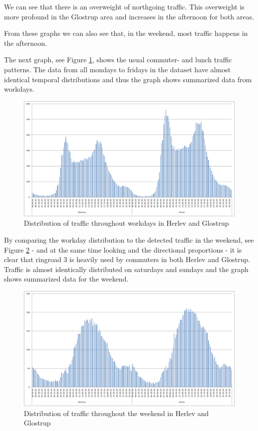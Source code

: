 We can see that there is an overweight of northgoing traffic. This overweight is more profound in the Glostrup area and increases in the afternoon for both areas.

From these graphs we can also see that, in the weekend, most traffic happens in the afternoon.

The next graph, see Figure \ref{fig:commuter}, shows the usual commuter- and lunch traffic patterns. The data from all mondays to fridays in the dataset have almost identical temporal distributions and thus the graph shows summarized data from workdays.

\begin{figure}[!ht]
\begin{center}
\includegraphics[scale=0.25]{distribution_workday.png} 
\end{center}
\caption{Distribution of traffic throughout workdays in Herlev and Glostrup}
\label{fig:commuter}
\end{figure}

By comparing the workday distribution to the detected traffic in the weekend, see Figure \ref{fig:weekends} - and at the same time looking and the directional proportions - it is clear that ringroad 3 is heavily used by commuters in both Herlev and Glostrup. Traffic is almost identically distributed on saturdays and sundays and the graph shows summarized data for the weekend.

\begin{figure}[!ht]
\begin{center}
\includegraphics[scale=0.25]{distribution_weekend.png} 
\end{center}
\caption{Distribution of traffic throughout the weekend in Herlev and Glostrup}
\label{fig:weekends}
\end{figure}

